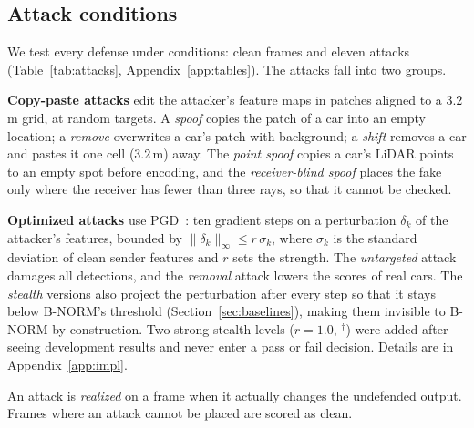 \documentclass[conference]{IEEEtran}
\begin{document}
\subsection{Attack conditions}
\label{sec:attacks}
We test every defense under \NumConditions{} conditions: clean frames and eleven attacks
(Table~\ref{tab:attacks}, Appendix~\ref{app:tables}). The attacks fall into two groups.

\textbf{Copy-paste attacks} edit the attacker's feature maps in patches aligned to a $3.2$\,m grid, at random
targets. A \emph{spoof} copies the patch of a car into an empty location; a \emph{remove} overwrites a car's patch
with background; a \emph{shift} removes a car and pastes it one cell ($3.2$\,m) away. The \emph{point spoof}
copies a car's LiDAR points to an empty spot before encoding, and the \emph{receiver-blind spoof} places the fake
only where the receiver has fewer than three rays, so that it cannot be checked.

\textbf{Optimized attacks} use PGD~\cite{madry2018pgd}: ten gradient steps on a perturbation $\delta_k$ of the
attacker's features, bounded by $\|\delta_k\|_\infty\le r\,\sigma_k$, where $\sigma_k$ is the standard deviation of
clean sender features and $r$ sets the strength. The \emph{untargeted} attack damages all detections, and the
\emph{removal} attack lowers the scores of real cars. The \emph{stealth} versions also project the perturbation
after every step so that it stays below B-NORM's threshold (Section~\ref{sec:baselines}), making them invisible to
B-NORM by construction. Two strong stealth levels ($r=1.0$, $^\dagger$) were added after seeing development
results and never enter a pass or fail decision. Details are in Appendix~\ref{app:impl}.

An attack is \emph{realized} on a frame when it actually changes the undefended output. Frames where an attack
cannot be placed are scored as clean.
\end{document}
